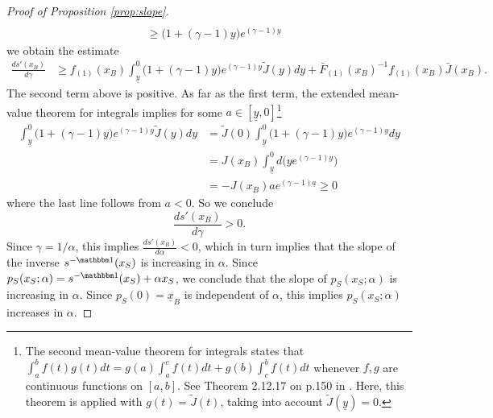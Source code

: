 \documentclass[11pt,twopage]{article}
\newcommand{\ul}{\underline}
\begin{document}
\begin{proof}[Proof of Proposition \ref{prop:slope}]
\begin{align*}
    \\&\geq \Big(1+(\gamma - 1)y \Big)e^{(\gamma - 1) y}
  \end{align*}
  we obtain the estimate
  \begin{align*}
    \frac{ds'(x_B)}{d \gamma} &\geq f_{(1)}(x_B)\int_{\ul y}^{0}
    \Big(1+(\gamma - 1)y \Big)e^{(\gamma - 1) y} \tilde J(y) dy+\bar
    F_{(1)}(x_B)^{-1} f_{(1)}(x_B) \bar J(x_B).
  \end{align*}
  The second term above is positive. As far as the first term, the
  extended mean-value theorem for integrals implies for some $a \in
  [\ul y,0]$\footnote{The second mean-value theorem for integrals
    states that $\int_a^b f(t)g(t)dt = g(a) \int_a^c f(t)dt+ g(b)
    \int_c^b f(t)dt$ whenever $f,g$ are continuous functions on
    $[a,b]$. See Theorem 2.12.17 on p.150 in
    \cite{bogachev2007measure}. Here, this theorem is applied with
    $g(t) = \tilde J(t)$, taking into account $\tilde J(\ul y) = 0$.}
  \begin{align*}
    \int_{\ul y}^{0} \Big(1+(\gamma - 1)y \Big)e^{(\gamma - 1) y}
    \tilde J(y) dy &= \tilde J(0) \int_{\ul y}^{0} \Big(1+(\gamma -
    1)y \Big)e^{(\gamma - 1) y} dy \\&=J(x_B) \int_{\ul y}^{0}
    d\Big(ye^{(\gamma - 1) y}\Big) \\&=-J(x_B) a e^{(\gamma - 1) \ul
      a}\geq 0
  \end{align*}
  where the last line follows from $a<0$. So we conclude \[
  \frac{ds'(x_B)}{d \gamma}> 0.\] Since $\gamma = 1/\alpha$, this
  implies $\frac{ds'(x_B)}{d \alpha}<0$, which in turn implies that
  the slope of the inverse $s^{-\mathbbm 1}(x_S)$ is increasing in
  $\alpha$. Since $p_S(x_S;\alpha) = s^{-\mathbbm 1}(x_S)+\alpha x_S$,
  we conclude that the slope of $p_S(x_S;\alpha)$ is increasing in
  $\alpha$. Since $p_S(0) = \ul x_B$ is independent of $\alpha$, this
  implies $p_S(x_S;\alpha)$ increases in $\alpha$.

\end{proof}
\end{document}
